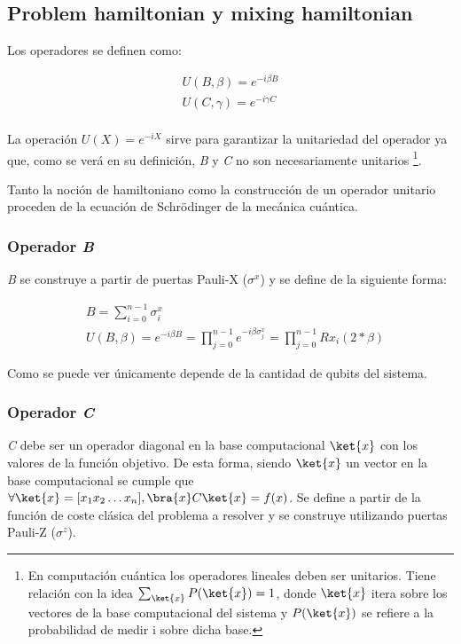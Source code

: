 \subsection{Problem hamiltonian y mixing hamiltonian}

Los operadores se definen como:

\begin{align*}
  U(B, \beta) = e^{-i \beta B} \\
  U(C, \gamma) = e^{-i \gamma C} \\
\end{align*}

La operación \(U(X) = e^{-i X}\) sirve para garantizar la unitariedad del operador ya que, como se verá en su definición, \textit{B} y \textit{C} no son necesariamente unitarios
\footnote{En computación cuántica los operadores lineales deben ser unitarios. Tiene relación con la idea
  $\sum_{\ket{x}} {P(\ket{x})} = 1$,
  donde $\ket{x}$ itera sobre los vectores de la base computacional del sistema y
  \(P(\ket{x})\) se refiere a la probabilidad de medir i sobre dicha base.}.

Tanto la noción de hamiltoniano como la construcción de un operador unitario proceden de la ecuación de Schrödinger de la mecánica cuántica.

\subsubsection{Operador \textit{B}}
\textit{B} se construye a partir de puertas Pauli-X ($\sigma^x$) y se define de la siguiente forma:

\begin{align*}
  &B = \sum_{i=0}^{n-1}\sigma^x_{i} \\
  &U(B, \beta) = e^{-i \beta B} = \prod_{j=0}^{n-1}e^{-i \beta \sigma^x_j} = \prod_{j=0}^{n-1}Rx_i(2*\beta)  %
\end{align*}

Como se puede ver únicamente depende de la cantidad de qubits del sistema.

\subsubsection{Operador \textit{C}\label{sec:3-operador c}}
\textit{C} debe ser un operador diagonal  %
en la base computacional \(\ket{x}\) con los valores de la función objetivo. De esta forma, siendo \(\ket{x}\) un vector en la base computacional se cumple que \(\forall \ket{x} = [x_1x_2 \ldots x_n], \bra{x}C\ket{x} = f(x)\). Se define a partir de la función de coste clásica del problema a resolver y se construye utilizando puertas Pauli-Z ($\sigma^z$).

